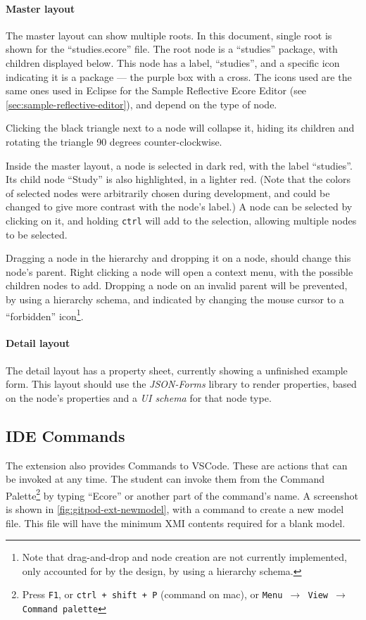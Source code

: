 \paragraph{Master layout}
The master layout can show multiple roots.
In this document,  single root is shown for the ``studies.ecore'' file.
The root node is a ``studies'' package, with children displayed below.
This node has a label, ``studies'', and a specific icon indicating it is a package --- the purple box with a cross.
The icons used are the same ones used in \gls{Eclipse} for the Sample Reflective Ecore Editor (see \cref{sec:sample-reflective-editor}), and depend on the type of node.

Clicking the black triangle next to a node will collapse it, hiding its children and rotating the triangle 90 degrees counter-clockwise.

Inside the master layout, a node is selected in dark red, with the label ``studies''.
Its child node ``Study'' is also highlighted, in a lighter red.
(Note that the colors of selected nodes were arbitrarily chosen during development, and could be changed to give more contrast with the node's label.)
A node can be selected by clicking on it, and holding \texttt{ctrl} will add to the selection, allowing multiple nodes to be selected.

Dragging a node in the hierarchy and dropping it on a node, should change this node's parent.
Right clicking a node will open a context menu, with the possible children nodes to add.
Dropping a node on an invalid parent will be prevented, by using a hierarchy schema, and indicated by changing the mouse cursor to a ``forbidden'' icon\footnote{Note that drag-and-drop and node creation are not currently implemented, only accounted for by the design, by using a hierarchy schema.}.


\paragraph{Detail layout}
The detail layout has a property sheet, currently showing a unfinished example form.
This layout should use the \textit{JSON-Forms} library to render properties, based on the node's properties and a \textit{UI schema} for that node type.


\subsection{IDE Commands}

The extension also provides Commands to \gls{VSCode}.
These are actions that can be invoked at any time.
The student can invoke them from the Command Palette\footnote{Press \texttt{F1}, or \texttt{ctrl + shift + P} (command on mac), or \texttt{Menu $\rightarrow$ View $\rightarrow$ Command palette}} by typing ``Ecore'' or another part of the command's name.
A screenshot is shown in \cref{fig:gitpod-ext-newmodel}, with a command to create a new model file.
This file will have the minimum \acrshort{XMI} contents required for a blank model.

